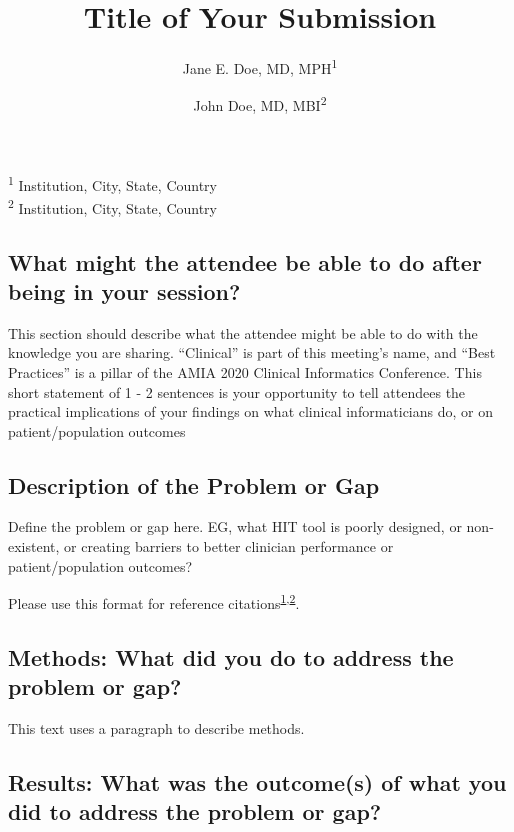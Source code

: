\documentclass[
]{article}
\title{\textbf{Title of Your Submission}}
\author{Jane E. Doe, MD, MPH\textsuperscript{1} \and John Doe, MD, MBI\textsuperscript{2}}
\date{}
\begin{document}
\maketitle

\textsuperscript{1} Institution, City, State, Country\\
\textsuperscript{2} Institution, City, State, Country

\hypertarget{what-might-the-attendee-be-able-to-do-after-being-in-your-session}{%
\subsection{What might the attendee be able to do after being in your session?}\label{what-might-the-attendee-be-able-to-do-after-being-in-your-session}}

This section should describe what the attendee might be able to do with the knowledge you are sharing. ``Clinical'' is part of this meeting's name, and ``Best Practices'' is a pillar of the AMIA 2020 Clinical Informatics Conference. This short statement of 1 - 2 sentences is your opportunity to tell attendees the practical implications of your findings on what clinical informaticians do, or on patient/population outcomes

\hypertarget{description-of-the-problem-or-gap}{%
\subsection{Description of the Problem or Gap}\label{description-of-the-problem-or-gap}}

Define the problem or gap here. EG, what HIT tool is poorly designed, or non-existent, or creating barriers to better clinician performance or patient/population outcomes?

Please use this format for reference citations\textsuperscript{\protect\hyperlink{ref-pryor_help_1983}{1},\protect\hyperlink{ref-gardner_computer-critiqued_1990}{2}}.

\hypertarget{methods-what-did-you-do-to-address-the-problem-or-gap}{%
\subsection{Methods: What did you do to address the problem or gap?}\label{methods-what-did-you-do-to-address-the-problem-or-gap}}

This text uses a paragraph to describe methods.

\hypertarget{results-what-was-the-outcomes-of-what-you-did-to-address-the-problem-or-gap}{%
\subsection{Results: What was the outcome(s) of what you did to address the problem or gap?}\label{results-what-was-the-outcomes-of-what-you-did-to-address-the-problem-or-gap}}
\end{document}
